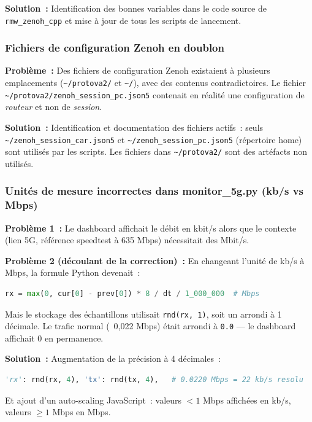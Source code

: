 \documentclass[a4paper,11pt]{article}
\begin{document}
\textbf{Solution~:} Identification des bonnes variables dans le code source de
\texttt{rmw\_zenoh\_cpp} et mise à jour de tous les scripts de lancement.

\subsubsection{Fichiers de configuration Zenoh en doublon}

\textbf{Problème~:} Des fichiers de configuration Zenoh existaient à plusieurs
emplacements (\texttt{\textasciitilde/protova2/} et \texttt{\textasciitilde/}), avec
des contenus contradictoires. Le fichier
\texttt{\textasciitilde/protova2/zenoh\_session\_pc.json5} contenait en réalité
une configuration de \textit{routeur} et non de \textit{session}.

\textbf{Solution~:} Identification et documentation des fichiers actifs~:
seuls \texttt{\textasciitilde/zenoh\_session\_car.json5} et
\texttt{\textasciitilde/zenoh\_session\_pc.json5} (répertoire home) sont utilisés
par les scripts. Les fichiers dans \texttt{\textasciitilde/protova2/} sont des
artéfacts non utilisés.

\subsubsection{Unités de mesure incorrectes dans monitor\_5g.py (kb/s vs Mbps)}

\textbf{Problème 1~:} Le dashboard affichait le débit en kbit/s alors que le contexte
(lien 5G, référence speedtest à 635 Mbps) nécessitait des Mbit/s.

\textbf{Problème 2 (découlant de la correction)~:} En changeant l'unité de kb/s à
Mbps, la formule Python devenait~:
\begin{lstlisting}[language=python]
rx = max(0, cur[0] - prev[0]) * 8 / dt / 1_000_000  # Mbps
\end{lstlisting}
Mais le stockage des échantillons utilisait \texttt{rnd(rx, 1)}, soit un arrondi à
1 décimale. Le trafic normal (~0,022 Mbps) était arrondi à \texttt{0.0} — le
dashboard affichait 0 en permanence.

\textbf{Solution~:} Augmentation de la précision à 4 décimales~:
\begin{lstlisting}[language=python]
'rx': rnd(rx, 4), 'tx': rnd(tx, 4),   # 0.0220 Mbps = 22 kb/s resolu
\end{lstlisting}
Et ajout d'un auto-scaling JavaScript~: valeurs $< 1$ Mbps affichées en kb/s,
valeurs $\geq 1$ Mbps en Mbps.
\end{document}
